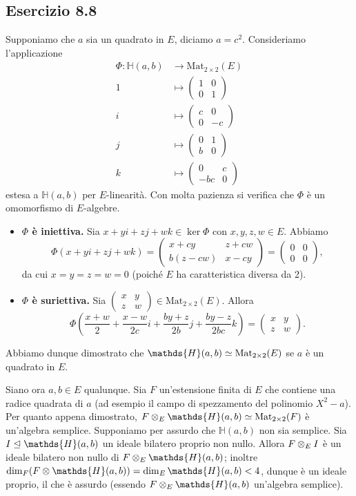 \documentclass[a4paper]{article}
\newcommand*{\HH}{\mathds{H}}
\newcommand*{\Mat}{\text{Mat}_{2\times2}}
\newcommand*{\mattwo}[4]{\begin{pmatrix}#1&#2\\#3&#4\end{pmatrix}}
\begin{document}
\subsection*{Esercizio 8.8}
Supponiamo che $a$ sia un quadrato in $E$, diciamo $a=c^2$. Consideriamo l'applicazione
\begin{align*}
\Phi:\HH(a,b)&\longrightarrow\Mat(E)\\
1&\longmapsto\mattwo{1}{0}{0}{1}\\
i&\longmapsto\mattwo{c}{0}{0}{-c}\\
j&\longmapsto\mattwo{0}{1}{b}{0}\\
k&\longmapsto\mattwo{0}{c}{-bc}{0}
\end{align*}
estesa a $\HH(a,b)$ per $E$-linearità. Con molta pazienza si verifica che $\Phi$ è un omomorfismo di $E$-algebre.
\begin{itemize}
\item \textbf{$\Phi$ è iniettiva.} Sia $x+yi+zj+wk\in\ker\Phi$ con $x,y,z,w\in E$. Abbiamo
$$
\Phi(x+yi+zj+wk)=\mattwo{x+cy}{z+cw}{b(z-cw)}{x-cy}=\mattwo{0}{0}{0}{0},
$$
da cui $x=y=z=w=0$ (poiché $E$ ha caratteristica diversa da 2).
\item \textbf{$\Phi$ è suriettiva.} Sia $\mattwo{x}{y}{z}{w}\in\Mat(E)$. Allora
$$
\Phi\left(\frac{x+w}{2}+\frac{x-w}{2c}i+\frac{by+z}{2b}j+\frac{by-z}{2bc}k\right)=\mattwo{x}{y}{z}{w}.
$$
\end{itemize}
Abbiamo dunque dimostrato che $\HH(a,b)\iso\Mat(E)$ se $a$ è un quadrato in $E$.

Siano ora $a,b\in E$ qualunque. Sia $F$ un'estensione finita di $E$ che contiene una radice quadrata di $a$ (ad esempio il campo di spezzamento del polinomio $X^2-a$). Per quanto appena dimostrato, $F\tensor_E\HH(a,b)\iso\Mat(F)$ è un'algebra semplice. Supponiamo per assurdo che $\HH(a,b)$ non sia semplice. Sia $I\ideal\HH(a,b)$ un ideale bilatero proprio non nullo. Allora $F\otimes_E I$ è un ideale bilatero  non nullo di $F\tensor_E\HH(a,b)$; inoltre $\dim_F(F\tensor\HH(a,b))=\dim_E\HH(a,b)<4$, dunque è un ideale proprio, il che è assurdo (essendo $F\tensor_E\HH(a,b)$ un'algebra semplice).
\end{document}
